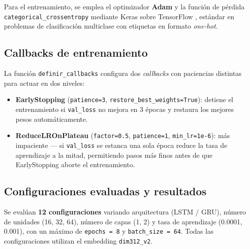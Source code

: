 \documentclass{article}
\begin{document}
\begin{sloppypar}
Para el entrenamiento, se emplea el optimizador \textbf{Adam} y la función de pérdida \texttt{categorical\_crossentropy} mediante Keras \cite{keras} sobre TensorFlow \cite{tensorflow}, estándar en problemas de clasificación multiclase con etiquetas en formato \textit{one-hot}.
\end{sloppypar}

\subsection{Callbacks de entrenamiento}

La función \texttt{definir\_callbacks} configura dos \textit{callbacks} con paciencias
distintas para actuar en dos niveles:

\begin{itemize}
  \item \textbf{EarlyStopping} (\texttt{patience=3}, \texttt{restore\_best\_weights=True}):
        detiene el entrenamiento si \texttt{val\_loss} no mejora en 3 épocas y restaura
        los mejores pesos automáticamente.
  \item \textbf{ReduceLROnPlateau} (\texttt{factor=0.5}, \texttt{patience=1},
        \texttt{min\_lr=1e-6}): más impaciente — si \texttt{val\_loss} se estanca una sola
        época reduce la tasa de aprendizaje a la mitad, permitiendo pasos más finos antes
        de que EarlyStopping aborte el entrenamiento.
\end{itemize}

\subsection{Configuraciones evaluadas y resultados}

Se evalúan \textbf{12 configuraciones} variando arquitectura (LSTM / GRU), número de unidades
(16, 32, 64), número de capas (1, 2) y tasa de aprendizaje (0.0001, 0.001), con un máximo
de \texttt{epochs = 8} y \texttt{batch\_size = 64}. Todas las configuraciones utilizan el
embedding \texttt{dim312\_v2}.
\end{document}

